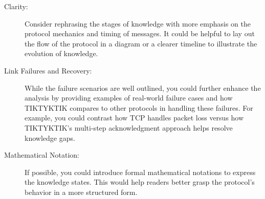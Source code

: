 \documentclass[../HFT-main.tex]{subfiles}
\begin{document}
\begin{description}
	\item [Clarity:] Consider rephrasing the stages of knowledge with more emphasis on the protocol mechanics and timing of messages. It could be helpful to lay out the flow of the protocol in a diagram or a clearer timeline to illustrate the evolution of knowledge.
	\item [Link Failures and Recovery:] While the failure scenarios are well outlined, you could further enhance the analysis by providing examples of real-world failure cases and how TIKTYKTIK compares to other protocols in handling these failures. For example, you could contrast how TCP handles packet loss versus how TIKTYKTIK’s multi-step acknowledgment approach helps resolve knowledge gaps.
	\item [Mathematical Notation:]If possible, you could introduce formal mathematical notations to express the knowledge states. This would help readers better grasp the protocol’s behavior in a more structured form.
\end{description}


%
%
%
%
%
%
%
%
%
%
\end{document}
